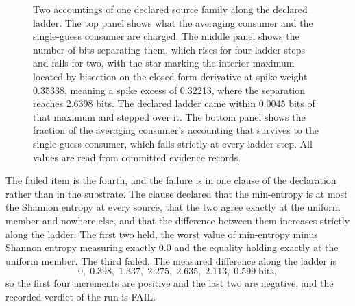 \documentclass[aps,pre,reprint,nofootinbib]{revtex4-2}
\begin{document}
\begin{figure}[t]
\centering
{}
\caption{Two accountings of one declared source family along the
declared ladder.  The top panel shows what the averaging consumer and
the single-guess consumer are charged.  The middle panel shows the
number of bits separating them, which rises for four ladder steps and
falls for two, with the star marking the interior maximum located by
bisection on the closed-form derivative at spike weight 0.35338,
meaning a spike excess of 0.32213, where
the separation reaches 2.6398 bits.  The declared ladder came within
0.0045 bits of that maximum and stepped over it.  The bottom panel
shows the fraction of the averaging consumer's accounting that
survives to the single-guess consumer, which falls strictly at every
ladder step.  All values are read from committed evidence records.}
\label{fig:cr3}
\end{figure}

The failed item is the fourth, and the failure is in one clause of the
declaration rather than in the substrate.  The clause declared that
the min-entropy is at most the Shannon entropy at every source, that
the two agree exactly at the uniform member and nowhere else, and that
the difference between them increases strictly along the ladder.  The
first two held, the worst value of min-entropy minus Shannon entropy
measuring exactly $0.0$ and the equality holding exactly at the
uniform member.  The third failed.  The measured difference along the
ladder is
\begin{equation}
  0,\; 0.398,\; 1.337,\; 2.275,\; 2.635,\; 2.113,\; 0.599
  \;\text{bits},
  \label{eq:diff}
\end{equation}
so the first four increments are positive and the last two are
negative, and the recorded verdict of the run is FAIL.
\end{document}
